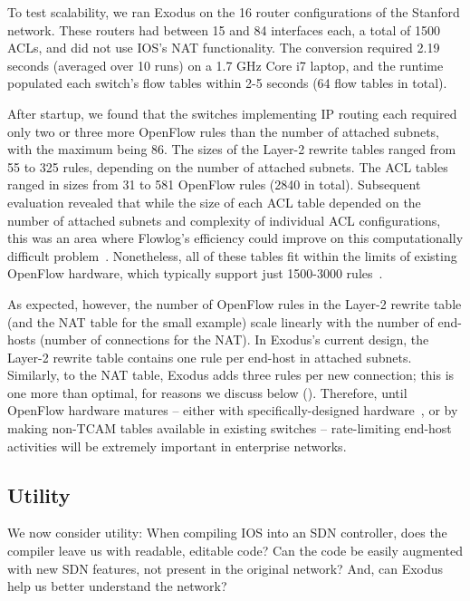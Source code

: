 To test scalability, we ran Exodus on the 16 router configurations of the Stanford
network.
%
These routers had between 15 and 84 interfaces each, a total of 1500 ACLs, and did
not use IOS's NAT functionality. The conversion required 2.19 seconds (averaged over
10 runs) on a 1.7 GHz Core i7 laptop, and the runtime
populated each switch's flow tables within 2-5 seconds (64 flow tables in total).

After startup, we found that the switches implementing IP routing each required only two or three more
OpenFlow rules than the number of attached subnets, with the maximum being 86.
The sizes of the Layer-2 rewrite tables ranged from 55 to 325 rules, depending on the
number of attached subnets.
The ACL tables ranged in sizes from 31 to 581 OpenFlow rules (2840 in total).
Subsequent evaluation revealed that while the size of each ACL table depended on the
number of attached subnets and complexity of individual ACL configurations, this
was an area where Flowlog's efficiency could improve on this computationally difficult
problem~\cite{Applegate:2007compressing}.
Nonetheless, all of these tables fit within the limits of existing
OpenFlow hardware, which typically support just 1500-3000 rules~\cite{Rotsos:2012oflops}.

As expected, however, the number of OpenFlow rules in the Layer-2 rewrite table
(and the NAT table for the small example) scale linearly with the number of end-hosts
(number of connections for the NAT). In Exodus's current design, the Layer-2 rewrite
table contains one rule per end-host in attached subnets.
Similarly, to the NAT table, Exodus adds three rules per new connection; this is one
more than optimal, for reasons we discuss below ().
Therefore, until OpenFlow hardware matures -- either with specifically-designed hardware~\cite{Bosshart:2013ppipp-arxiv},
or by making non-TCAM tables available in existing switches -- rate-limiting end-host activities will
be extremely important in enterprise networks.

\subsection{Utility}
\label{sec:utility}

We now consider utility: When compiling IOS into an SDN
controller, does the compiler leave us with readable, editable code?
Can the code be easily augmented with new SDN features, not present in the
original network? And, can Exodus help us better understand the network?

